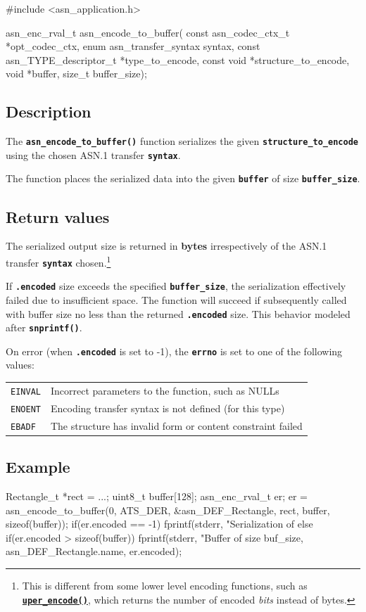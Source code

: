 \documentclass[english,oneside,12pt]{book}
\newcommand{\api}[2]{\hyperref[#1]{\code{#2}}}
\newcommand{\code}[1]{\texttt{\textbf{\lstinline{#1}}}}
\begin{document}
\begin{signature}
#include <asn_application.h>

asn_enc_rval_t asn_encode_to_buffer(
    const asn_codec_ctx_t *opt_codec_ctx,
    enum asn_transfer_syntax syntax,
    const asn_TYPE_descriptor_t *type_to_encode,
    const void *structure_to_encode,
    void *buffer, size_t buffer_size);
\end{signature}

\subsection*{Description}

The \code{asn_encode_to_buffer()} function serializes the given \code{structure_to_encode} using the chosen ASN.1 transfer \code{syntax}.

The function places the serialized data into the given
\code{buffer} of size \code{buffer_size}.

\subsection*{Return values}


The serialized output size is returned in \textbf{bytes} irrespectively of the
ASN.1 transfer \code{syntax} chosen.\footnote{This is different from some
lower level encoding functions, such as \api{sec:uper_encode}{uper_encode()},
which returns the number of encoded \emph{bits} instead of bytes.}

If \code{.encoded} size exceeds the specified \code{buffer_size},
the serialization effectively failed due to insufficient space. The function
will succeed if subsequently called with buffer size no less than the returned
\code{.encoded} size. This behavior modeled after \code{snprintf()}.

On error (when \code{.encoded} is set to -1),
the \code{errno} is set to one of the following values:

\begin{tabular}[h!]{ll}
\texttt{EINVAL} & Incorrect parameters to the function, such as NULLs \\
\texttt{ENOENT} & Encoding transfer syntax is not defined (for this type) \\
\texttt{EBADF} & The structure has invalid form or content constraint failed
\end{tabular}

\subsection*{Example}
\begin{example}
Rectangle_t *rect = ...;
uint8_t buffer[128];
asn_enc_rval_t er;
er = asn_encode_to_buffer(0, ATS_DER, &asn_DEF_Rectangle, rect, buffer, sizeof(buffer));
if(er.encoded == -1) {
   fprintf(stderr, "Serialization of %
} else if(er.encoded > sizeof(buffer)) {
   fprintf(stderr, "Buffer of size %
       buf_size, asn_DEF_Rectangle.name, er.encoded);
}
\end{example}
\end{document}
